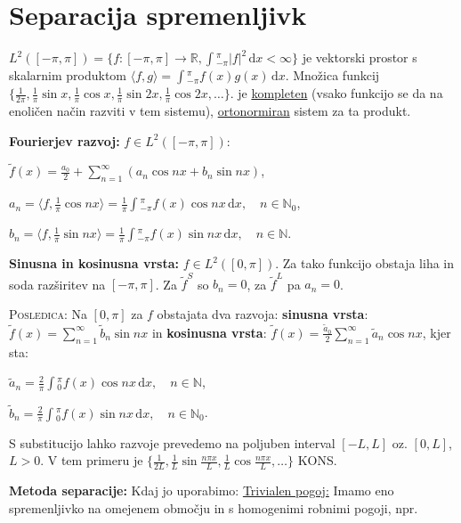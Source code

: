 \documentclass[11pt,a4paper]{amsart}
\theoremstyle{definition} %
\theoremstyle{plain} %
\newcommand{\dx}{\ensuremath{\,\mathrm{d}x}}
\let\oldint\int
\renewcommand{\int}{\oldint \!}
\newcommand{\R}{\mathbb R}
\newcommand{\N}{\mathbb N}
\begin{document}
\thispagestyle{empty}
\setlength{\parindent}{0pt}




\section*{Separacija spremenljivk}

$L^2([-\pi,\pi]) = \{f:[-\pi,\pi]\longrightarrow \R, \int_{-\pi}^\pi |f|^2 \dx < \infty \}$ je vektorski prostor s skalarnim produktom $\langle f, g\rangle =
\int_{-\pi}^\pi f(x)g(x)\dx$. Množica funkcij
  $\{\frac{1}{2\pi},
  \frac{1}{\pi}\sin{x},\frac{1}{\pi}\cos{x},\frac{1}{\pi}\sin{2x},\frac{1}{\pi}\cos{2x},\ldots
\}$. je \underline{kompleten} (vsako funkcijo se da na enoličen način razviti v
tem sistemu),  \underline{ortonormiran} sistem za ta produkt.

\textbf{Fourierjev razvoj:} $f \in L^2([-\pi,\pi])$:

$\tilde{f}(x) = \frac{a_0}{2} + \sum_{n=1}^{\infty}(a_n\cos{nx} + b_n\sin{nx})$,

$a_n = \langle f,\frac{1}{\pi}\cos{nx} \rangle =
\frac{1}{\pi}\int_{-\pi}^{\pi}f(x)\cos{nx}\dx, \quad n \in \N_0$,

$b_n = \langle f,\frac{1}{\pi}\sin{nx} \rangle =
\frac{1}{\pi}\int_{-\pi}^{\pi}f(x)\sin{nx}\dx, \quad n \in \N$.

\textbf{Sinusna in kosinusna vrsta:} $f \in L^2([0,\pi])$. Za tako funkcijo
obstaja liha in soda razširitev na $[-\pi,\pi]$. Za $\tilde{f}^S$ so $b_n = 0$,
za $\tilde{f}^L$ pa $a_n = 0$.

\textsc{Posledica:} Na $[0,\pi]$ za $f$ obstajata dva razvoja: \textbf{sinusna
vrsta}: $\tilde{f}(x) =  \sum_{n=1}^{\infty} \tilde{b}_n\sin{nx}$ in
\textbf{kosinusna vrsta}:  $\tilde{f}(x) =
\frac{\tilde{a}_0}{2}\sum_{n=1}^{\infty}\tilde{a}_n\cos{nx}$, kjer sta:

$\tilde{a}_n = \frac{2}{\pi}\int_0^{\pi}f(x)\cos{nx}\dx, \quad n \in \N$,

$\tilde{b}_n = \frac{2}{\pi}\int_0^{\pi}f(x)\sin{nx}\dx, \quad n \in \N_0$.

S substitucijo lahko razvoje prevedemo na poljuben interval $[-L,L]$ oz.
$[0,L]$, $L > 0$. V tem primeru je $\{\frac{1}{2L}, \frac{1}{L}\sin{\frac{n\pi
x}{L}},\frac{1}{L}\cos{\frac{n\pi x}{L}},\ldots \}$ KONS.


\textbf{Metoda separacije:} Kdaj jo uporabimo: \underline{Trivialen pogoj:}
Imamo eno spremenljivko na omejenem območju in s homogenimi robnimi pogoji, npr.
\end{document}
